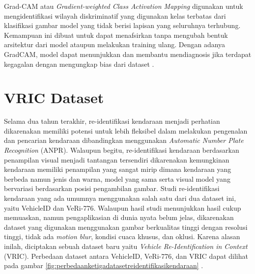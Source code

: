 Grad-CAM atau \emph{Gradient-weighted Class Activation Mapping} digunakan untuk mengidentifikasi wilayah diskriminatif yang digunakan kelas terbatas dari klasifikasi gambar model 
yang tidak berisi lapisan yang seluruhnya terhubung. Kemampuan ini dibuat untuk dapat menafsirkan tanpa mengubah bentuk arsitektur dari model ataupun melakukan training ulang. 
Dengan adanya GradCAM, model dapat menunjukkan dan membantu mendiagnosis jika terdapat kegagalan dengan mengungkap bias dari dataset \parencite{Selvaraju2019}.

\section{VRIC Dataset}
\label{sec:vricdataset}

Selama dua tahun terakhir, re-identifikasi kendaraan menjadi perhatian dikarenakan \linebreak memiliki potensi untuk lebih fleksibel dalam melakukan pengenalan dan pencarian kendaraan dibandingkan 
menggunakan \emph{Automatic Number Plate Recognition} (ANPR). Walaupun begitu, re-identifikasi kendaraan berdasarkan penampilan visual menjadi tantangan tersendiri dikarenakan kemungkinan 
kendaraan memiliki penampilan yang sangat mirip dimana kendaraan yang berbeda namun jenis dan warna, model yang sama serta visual model yang bervariasi \linebreak berdasarkan posisi pengambilan 
gambar. Studi re-identifikasi kendaraan yang ada umumnya menggunakan salah satu dari dua dataset ini, yaitu VehicleID dan VeRi-776. Walaupun hasil studi menunjukkan hasil cukup memuaskan, 
namun pengaplikasian di dunia nyata belum jelas, dikarenakan dataset yang digunakan menggunakan gambar berkualitas tinggi dengan resolusi tinggi, tidak ada \emph{motion blur}, kondisi cuaca 
khusus, dan oklusi. Karena alasan inilah, diciptakan sebuah dataset baru yaitu \emph{Vehicle Re-Identification in Context} (VRIC). Perbedaan dataset antara VehicleID, VeRi-776, dan VRIC 
dapat dilihat pada gambar \ref{fig:perbedaanketigadatasetreidentifikasikendaraan} \parencite{Kanaci2018}.

